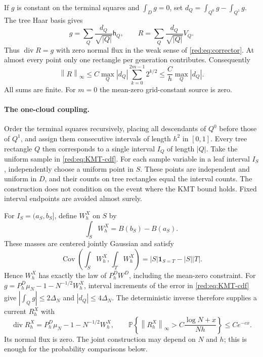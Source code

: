 \documentclass[11pt]{article}
\theoremstyle{definition}
\theoremstyle{remark}
\numberwithin{equation}{section}
\newcommand{\Pp}{\mathbb P}
\newcommand{\divv}{\operatorname{div}}
\newcommand{\one}{\mathbf 1}
\newcommand{\norm}[1]{\left\|#1\right\|}
\begin{document}
If $g$ is constant on the terminal squares and $\int_Dg=0$, set
$d_Q=\int_{Q^0}g-\int_{Q^1}g$. The tree Haar basis gives
\[
 g=\sum_Q\frac{d_Q}{\sqrt{|Q|}}\mathsf h_Q,
 \qquad R=\sum_Q\frac{d_Q}{\sqrt{|Q|}}V_Q.
\]
Thus $\divv R=g$ with zero normal flux in the weak sense of
\eqref{red:eq:corrector}. At almost every point only one rectangle
per generation contributes. Consequently
\begin{equation}\label{red:eq:tree-discrepancy-inverse}
 \norm R_\infty\le
 C\max_Q|d_Q|\sum_{k=0}^{2m-1}2^{k/2}
 \le \frac Ch\max_Q|d_Q|.
\end{equation}
All sums are finite. For $m=0$ the mean-zero grid-constant source is zero.

\paragraph{The one-cloud coupling.}
Order the terminal squares recursively, placing all descendants
of $Q^0$ before those of $Q^1$, and assign them consecutive intervals
of length $h^2$ in $[0,1]$. Every tree rectangle $Q$ then corresponds
to a single interval $I_Q$ of length $|Q|$.
Take the uniform sample in \eqref{red:eq:KMT-cdf}. For each sample
variable in a leaf interval $I_S$, independently choose a uniform
point in $S$. These points are independent and uniform in $D$,
and their counts on tree rectangles equal the interval counts.
The construction does not condition on the event where the KMT
bound holds. Fixed interval endpoints are avoided almost surely.

For $I_S=(a_S,b_S]$, define $W_h^X$ on $S$ by
\[
 \int_S W_h^X=B(b_S)-B(a_S).
\]
These masses are centered jointly Gaussian and satisfy
\[
 \operatorname{Cov}\left(\int_S W_h^X,\int_T W_h^X\right)
 =|S|\one_{S=T}-|S||T|.
\]
Hence $W_h^X$ has exactly the law of $P_h^DW^D$, including the
mean-zero constraint. For
$g=P_h^D\mu_N-1-N^{-1/2}W_h^X$, interval increments of the
error in \eqref{red:eq:KMT-cdf} give
$|\int_Qg|\le2\Delta_N$ and $|d_Q|\le4\Delta_N$.
The deterministic inverse therefore supplies a current $R_h^X$ with
\begin{equation}\label{red:eq:one-cloud-KMT}
 \divv R_h^X=P_h^D\mu_N-1-N^{-1/2}W_h^X,
 \qquad
 \Pp\!\left\{\norm{R_h^X}_\infty>
 C\frac{\log N+x}{Nh}\right\}\le Ce^{-cx}.
\end{equation}
Its normal flux is zero. The joint construction may depend on
$N$ and $h$; this is enough for the probability comparisons below.
\end{document}
